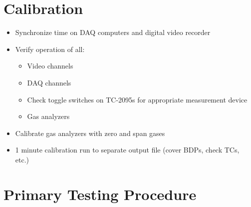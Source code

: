 \documentclass[11pt,oneside]{book}
\begin{document}
\section{Calibration}

\begin{itemize}
\item Synchronize time on DAQ computers and digital video recorder

\item Verify operation of all:
    \begin{itemize}
    \item Video channels
    \item DAQ channels
    \item Check toggle switches on TC-2095s for appropriate measurement device
    \item Gas analyzers
    \end{itemize}

\item Calibrate gas analyzers with zero and span gases

\item 1 minute calibration run to separate output file (cover BDPs, check TCs, etc.)

\end{itemize}

\section{Primary Testing Procedure}
\end{document}
